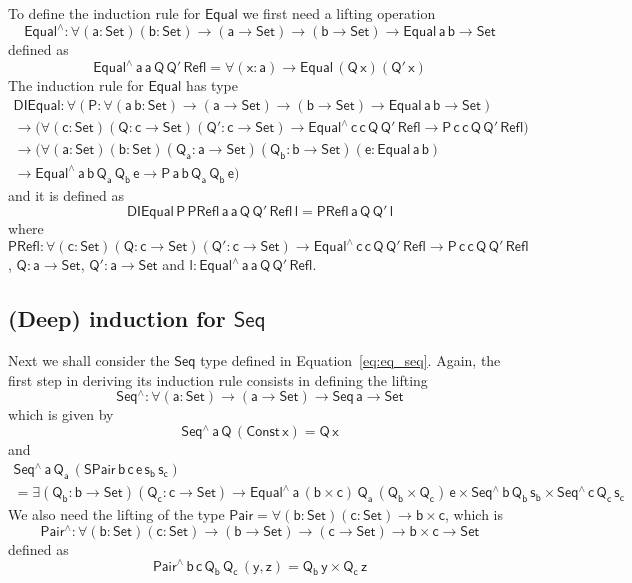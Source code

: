 \documentclass[acmsmall,screen,review,anonymous]{acmart}
\theoremstyle{definition}
\begin{document}
To define the induction rule for $\mathsf{Equal}$ we first need a lifting operation
\[
\mathsf{Equal^{\wedge} : \forall (a : Set) (b : Set) \to (a \to Set) \to (b \to Set) \to Equal\,a\,b \to Set}
\]
defined as
\[
\mathsf{Equal^{\wedge}\,a\,a\,Q\,Q'\,Refl = \forall (x : a) \to Equal\,(Q\,x)(Q'\,x)}
\]
The induction rule for $\mathsf{Equal}$ has type
\begin{multline}
\mathsf{DIEqual : \forall (P : \forall (a\,b : Set) \to (a \to Set) \to (b \to Set) \to Equal\,a\,b \to Set)} \\
\mathsf{\to \big( \forall (c : Set) (Q : c \to Set) (Q' : c \to Set) \to Equal^{\wedge}\,c\,c\,Q\,Q'\,Refl \to P\,c\,c\,Q\,Q'\,Refl \big)} \\
\mathsf{\to \big( \forall (a : Set) (b : Set) (Q_a : a \to Set) (Q_b : b \to Set) (e: Equal\,a\,b)} \\
	\mathsf{\to Equal^{\wedge}\,a\,b\,Q_a\,Q_b\,e \to P\,a\,b\,Q_a\,Q_b\,e \big)}
\end{multline}
and it is defined as
\[
\mathsf{DIEqual\,P\,PRefl\,a\,a\,Q\,Q'\,Refl\,l = PRefl\,a\,Q\,Q'\,l}
\]
where
$\mathsf{PRefl : \forall (c : Set) (Q : c \to Set) (Q' : c \to Set) \to Equal^{\wedge}\,c\,c\,Q\,Q'\,Refl \to P\,c\,c\,Q\,Q'\,Refl}$,
$\mathsf{Q : a \to Set}$, $\mathsf{Q' : a \to Set}$
and $\mathsf{l : Equal^{\wedge}\,a\,a\,Q\,Q'\,Refl}$.


\subsection{(Deep) induction for $\mathsf{Seq}$}

Next we shall consider the $\mathsf{Seq}$ type defined in Equation~\ref{eq:eq_seq}.
Again, the first step in deriving its induction rule consists in defining the lifting
\[
\mathsf{Seq^{\wedge} : \forall (a : Set) \to (a \to Set) \to Seq\,a \to Set}
\]
which is given by
\[
\mathsf{Seq^{\wedge}\,a\,Q\,(Const\,x) = Q\,x}
\]
and
\begin{multline*}
\mathsf{Seq^{\wedge}\,a\,Q_a\,(SPair\,b\,c\,e\,s_b\,s_c)} \\
\mathsf{=
\exists (Q_b : b \to Set) (Q_c : c \to Set)
\to Equal^{\wedge}\,a\, (b \times c)\, Q_a\, (Q_b \times Q_c) \, e \times Seq^{\wedge}\,b\,Q_b\,s_b \times Seq^{\wedge}\,c\,Q_c\,s_c
}
\end{multline*}
We also need the lifting of the type $\mathsf{Pair = \forall (b : Set)(c : Set) \to b \times c}$, which is 
\[
\mathsf{Pair^{\wedge} : \forall (b : Set)(c : Set) \to (b \to Set) \to (c \to Set) \to b \times c \to Set}
\]
defined as
\[
\mathsf{Pair^{\wedge}\,b\,c\,Q_b\,Q_c\,(y, z) = Q_b\,y \times Q_c\,z}
\]
\end{document}

